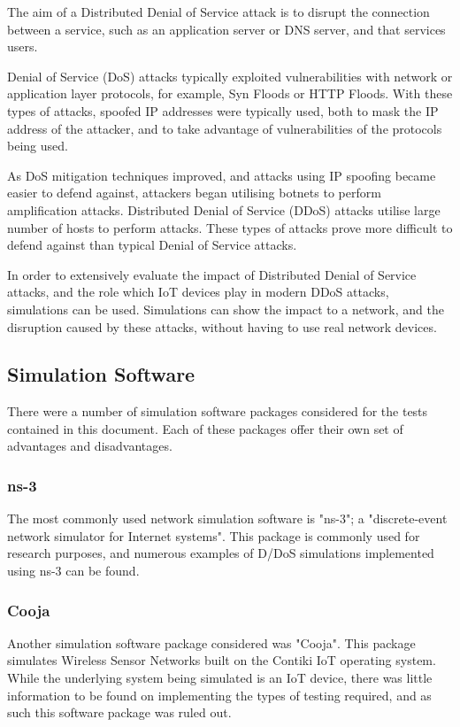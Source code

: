 The aim of a Distributed Denial of Service attack is to disrupt the connection
between a service, such as an application server or DNS server, and that
services users.

Denial of Service (DoS) attacks typically exploited vulnerabilities with network
or application layer protocols, for example, Syn Floods or HTTP Floods. With these
types of attacks, spoofed IP addresses were typically used, both to mask the IP
address of the attacker, and to take advantage of vulnerabilities of the
protocols being used.

As DoS mitigation techniques improved, and attacks using IP spoofing became
easier to defend against, attackers began utilising botnets to perform
amplification attacks. Distributed Denial of Service (DDoS) attacks utilise
large number of hosts to perform attacks. These types of attacks prove more
difficult to defend against than typical Denial of Service attacks.

In order to extensively evaluate the impact of Distributed Denial of Service
attacks, and the role which IoT devices play in modern DDoS attacks, simulations
can be used. Simulations can show the impact to a network, and the disruption
caused by these attacks, without having to use real network devices.

\subsection{Simulation Software}

There were a number of simulation software packages considered for the tests
contained in this document. Each of these packages offer their own set of
advantages and disadvantages.

\subsubsection{ns-3}

The most commonly used network simulation software is "ns-3"; a "discrete-event
network simulator for Internet systems"\cite{nsnam_20AD}. This package is
commonly used for research purposes, and numerous examples of D/DoS simulations
implemented using ns-3 can be found\cite{}\cite{}.

\subsubsection{Cooja}

Another simulation software package considered was "Cooja". This package
simulates Wireless Sensor Networks built on the Contiki IoT operating
system\cite{cooja_2019}. While the underlying system being simulated is an IoT device,
there was little information to be found on implementing the types of testing
required, and as such this software package was ruled out.

